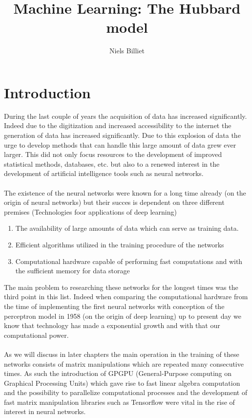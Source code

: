 \documentclass[12pt]{article}
\begin{document}
\title{Machine Learning: The Hubbard model}
\author{Niels Billiet}
\maketitle
\newpage
\tableofcontents
\newpage
\section{Introduction}

During the last couple of years the acquisition of data has increased significantly. Indeed due to the digitization and increased accessibility to the internet the generation of data has increased significantly. Due to this explosion of data the urge to develop methods that can handle this large amount of data grew ever larger. This did not only focus resources to the development of improved statistical methods, databases, etc. but also to a renewed interest in the development of artificial intelligence tools such as neural networks.
\\
\\
The existence of the neural networks were known for a long time already (on the origin of neural networks) but their succes is dependent on three different premises (Technologies foor applications of deep learning)
\begin{enumerate}
	\item The availability of large amounts of data which can serve as training data.
	\item Efficient algorithms utilized in the training procedure of the networks
	\item Computational hardware capable of performing fast computations and with the sufficient memory for data storage 
\end{enumerate} 
The main problem to researching these networks for the longest times was the third point in this list. Indeed when comparing the computational hardware from the time of implementing the first neural networks with conception of the perceptron model in 1958 (on the origin of deep learning) up to present day we know that technology has made a exponential growth and with that our computational power.
\\
\\
As we will discuss in later chapters the main operation in the training of these networks consists of matrix manipulations which are repeated many consecutive times. As such the introduction of GPGPU (General-Purpose computing on Graphical Processing Units) which gave rise to fast linear algebra computation and the possibility to parallelize computational processes and the development of fast matrix manipulation libraries such as Tensorflow were vital in the rise of interest in neural networks.
\end{document}
